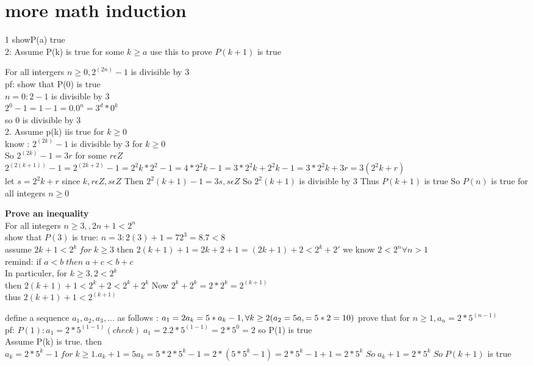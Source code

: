 \documentclass[10pt,letterpaper]{report}
\begin{document}
\section{more math induction}
\par{1 showP(a) true \\ 2: Assume P(k) is true for some $ k \geq a $ use this to prove $P(k+1)$ is true }
\par{For all intergers $ n \geq 0, 2^(2n) - 1 $ is divisible by 3 \\ pf: show that P(0) is true \\ $ n =0: 2 -1 $ is divisible by 3 \\ $ 2^0 -1 = 1 - 1 = 0 . 0^n = 3^d * 0^k $ \\ so 0 is divisible by 3  \\ 2. Assume p(k) iis true for $ k \geq 0$ \\ know : $2^(2k) -1 $ is divisible by 3 for $ k \geq 0 $ \\ So $2^(2k) - 1 = 3 r $ for some $ r \epsilon Z$ \\$ 2^(2(k+1)) -1 = 2^(2k+2) -1 = 2^2k * 2^2 -1 = 4 * 2^2k -1 = 3 * 2^2k + 2^2k -1 = 3 * 2^2k + 3r = 3(2^2k + r) $ \\ let $s = 2^2k + r $ since $k,r \epsilon Z , s \epsilon Z $ Then $2^2(k+1) -1 = 3s , s \epsilon Z $ So $2^2(k+1) $ is divisible by 3 Thus $ P(k+1) $ is true So $P(n) $ is true for all integers $ n\geq 0 $ } 

\par{\textbf{Prove an inequality} \\ For all integers $n \geq 3 ,, 2n + 1 <2^n $ \\ show that $P(3)$ is true: $n =3 : 2(3)+1 = 7 2^3 =8. 7<8 $ \\ assume $2k+1< 2^k \; for \; k \geq3$ then $ 2( k+1)+1 = 2k + 2 + 1 = (2k+1)+2 < 2^k +2'  $ we know $ 2< 2^n \forall n > 1$\\ remind: if $ a <b \;then \; a+c < b+c $ \\ In particuler, for $ k\geq 3 , 2 < 2^k$ \\then $2(k+1)+1 < 2^k + 2 < 2^k + 2^k $ Now $ 2^k + 2^k = 2 * 2^k = 2^(k+1) $ \\thus $2(k+1)+1 < 2^(k+1) $}
\par{define a sequence $a_1,a_2,a_3,... $ as follows : $ a_1 =2 a_k = 5 * a_k-1 , \forall k \geq 2 \\(a_2 = 5a, = 5 * 2 = 10 ) $ prove that for $n \geq 1 , a_n = 2 *5^(n-1) $ \\ pf: $ P(1): a_1 = 2*5^(1-1) (check) \; a_1 = 2. 2*5^(1-1) = 2*5^0 =2 $ so P(1) is true \\ Assume P(k) is true. then $ a_k = 2* 5^k-1 \; for \; k \geq 1. a_k+1 = 5 a_k = 5 * 2 * 5^k-1 = 2*(5*5^k-1 ) = 2* 5^k-1+1 = 2*5^k \; So \; a_k+1 = 2*5^k \; So \; P(k+1) $ is true }
\pagebreak
\end{document}
